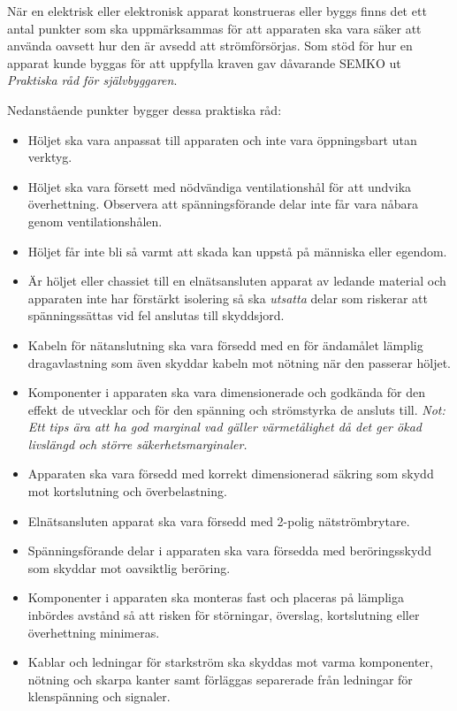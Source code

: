 När en elektrisk eller elektronisk apparat konstrueras eller byggs finns det
ett antal punkter som ska uppmärksammas för att apparaten ska vara säker att
använda oavsett hur den är avsedd att strömförsörjas.
Som stöd för hur en apparat kunde byggas för att uppfylla kraven gav
dåvarande SEMKO ut \emph{Praktiska råd för självbyggaren}.

Nedanstående punkter bygger dessa praktiska råd:

\begin{itemize}
\item Höljet ska vara anpassat till apparaten och inte vara öppningsbart
  utan verktyg.
  
\item Höljet ska vara försett med nödvändiga ventilationshål för att
  undvika överhettning.
  Observera att spänningsförande delar inte får vara nåbara genom
  ventilationshålen.

\item Höljet får inte bli så varmt att skada kan uppstå på människa
  eller egendom.

\item Är höljet eller chassiet till en elnätsansluten apparat av ledande
  material och apparaten inte har förstärkt isolering så ska \emph{utsatta}
  delar som riskerar att spänningssättas vid fel anslutas till skyddsjord.

\item Kabeln för nätanslutning ska vara försedd med en för ändamålet lämplig
  dragavlastning som även skyddar kabeln mot nötning när den passerar höljet.

\item Komponenter i apparaten ska vara dimensionerade och godkända
  för den effekt de utvecklar och för den spänning och strömstyrka de
  ansluts till.
  \emph{Not: Ett tips ära att ha god marginal vad gäller värmetålighet då det
    ger ökad livslängd och större säkerhetsmarginaler.}

\item Apparaten ska vara försedd med korrekt dimensionerad säkring
  som skydd mot kortslutning och överbelastning.

\item Elnätsansluten apparat ska vara försedd med 2-polig nätströmbrytare.

\item Spänningsförande delar i apparaten ska vara försedda med
  beröringsskydd som skyddar mot oavsiktlig beröring.

\item Komponenter i apparaten ska monteras fast och placeras på lämpliga
  inbördes avstånd så att risken för störningar, överslag, kortslutning eller
  överhettning minimeras.

\item Kablar och ledningar för starkström ska skyddas mot varma komponenter,
  nötning och skarpa kanter samt förläggas separerade från ledningar för
  klenspänning och signaler.
\end{itemize}

